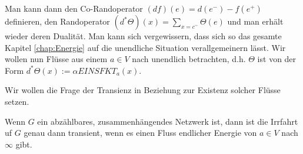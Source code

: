Man kann dann den Co-Randoperator $(df)(e)= d(e^-) - f(e^+)$ definieren, den Randoperator $(d^*\Theta)(x) = \sum\limits_{x = c^-}\Theta(e)$ und man erhält wieder deren Dualität. Man kann sich vergewissern, dass sich so das gesamte Kapitel \ref{chap:Energie} auf die unendliche Situation verallgemeinern lässt. Wir wollen nun Flüsse aus einem $a \in V$ nach unendlich betrachten, d.h. $\Theta$ ist von der Form $d^*\Theta(x) := \alpha EINSFKT_{a}(x)$. 

Wir wollen die Frage der Transienz in Beziehung zur Existenz solcher Flüsse setzen.

\begin{satz}[Lyans]
	Wenn $G$ ein abzählbares, zusammenhängendes Netzwerk ist, dann ist die Irrfahrt uf $G$ genau dann transient, wenn es einen Fluss endlicher Energie von $a \in V$ nach $\infty$ gibt.
\end{satz}
